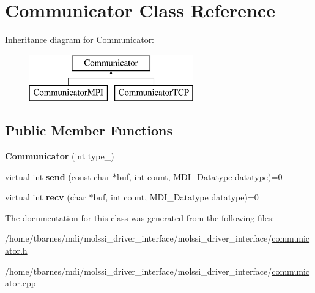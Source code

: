 \hypertarget{classCommunicator}{\section{Communicator Class Reference}
\label{classCommunicator}
}
Inheritance diagram for Communicator\-:\begin{figure}[H]
\begin{center}
\leavevmode
\includegraphics[height=2.000000cm]{classCommunicator}
\end{center}
\end{figure}
\subsection*{Public Member Functions}
\begin{DoxyCompactItemize}
\item 
\hypertarget{classCommunicator_a92ad155222aeafd1e5b1bd129809c2e9}{{\bfseries Communicator} (int type\-\_\-)}\label{classCommunicator_a92ad155222aeafd1e5b1bd129809c2e9}

\item 
\hypertarget{classCommunicator_a0a90cca12dcfb5721e9ac334e79c8802}{virtual int {\bfseries send} (const char $\ast$buf, int count, M\-D\-I\-\_\-\-Datatype datatype)=0}\label{classCommunicator_a0a90cca12dcfb5721e9ac334e79c8802}

\item 
\hypertarget{classCommunicator_af8618383684b7f2e1cea1a40acd43a81}{virtual int {\bfseries recv} (char $\ast$buf, int count, M\-D\-I\-\_\-\-Datatype datatype)=0}\label{classCommunicator_af8618383684b7f2e1cea1a40acd43a81}

\end{DoxyCompactItemize}


The documentation for this class was generated from the following files\-:\begin{DoxyCompactItemize}
\item 
/home/tbarnes/mdi/molssi\-\_\-driver\-\_\-interface/molssi\-\_\-driver\-\_\-interface/\hyperlink{communicator_8h}{communicator.\-h}\item 
/home/tbarnes/mdi/molssi\-\_\-driver\-\_\-interface/molssi\-\_\-driver\-\_\-interface/\hyperlink{communicator_8cpp}{communicator.\-cpp}\end{DoxyCompactItemize}
